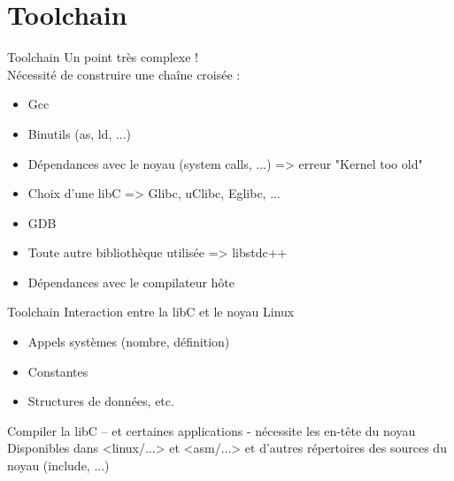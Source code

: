 \section{Toolchain}

\begin{frame}{Toolchain}{}
	Un point très complexe !\\
	Nécessité de construire une chaîne croisée :\\
	\begin{itemize}
		\item
			Gcc
		\item
			Binutils (as, ld, ...)
		\item
			Dépendances avec le noyau (system calls, ...) => erreur "Kernel too old"
		\item
			Choix d'une libC => Glibc, uClibc, Eglibc, ...
		\item
			GDB
		\item
			Toute autre bibliothèque utilisée => libstdc++
		\item
			Dépendances avec le compilateur hôte
	\end{itemize}
\end{frame}

\begin{frame}{Toolchain}{}
	Interaction entre la libC et le noyau Linux
	\begin{itemize}
		\item
			Appels systèmes (nombre, définition)
		\item
			Constantes 
		\item
			Structures de données, etc.
	\end{itemize}
	Compiler la libC – et certaines applications - nécessite les en-tête du noyau\\
	Disponibles dans <linux/...> et <asm/...> et d'autres répertoires des sources du noyau (include, ...)\\
\end{frame}


